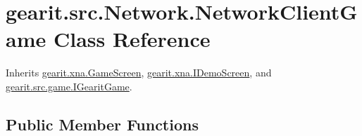 \hypertarget{classgearit_1_1src_1_1_network_1_1_network_client_game}{\section{gearit.\+src.\+Network.\+Network\+Client\+Game Class Reference}
\label{classgearit_1_1src_1_1_network_1_1_network_client_game}
}


Inherits \hyperlink{classgearit_1_1xna_1_1_game_screen}{gearit.\+xna.\+Game\+Screen}, \hyperlink{interfacegearit_1_1xna_1_1_i_demo_screen}{gearit.\+xna.\+I\+Demo\+Screen}, and \hyperlink{interfacegearit_1_1src_1_1game_1_1_i_gearit_game}{gearit.\+src.\+game.\+I\+Gearit\+Game}.

\subsection*{Public Member Functions}
